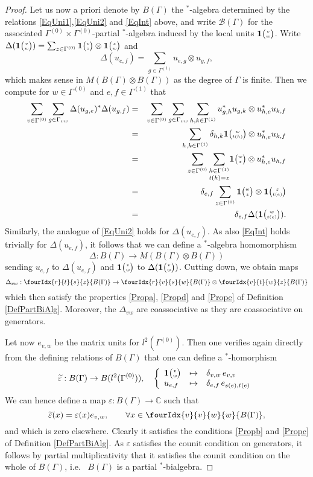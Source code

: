 \documentclass[10pt]{article}
\newcommand{\C}{\mathbb{C}}
\newcommand{\Grt}[3]{#1{\tiny {\begin{pmatrix} #2\\#3\end{pmatrix}}}}
\newcommand{\UnitC}[2]{\Grt{\mathbf{1}}{#1}{#2}}
\newcommand{\Gr}[5]{\fourIdx{#2}{#4}{#3}{#5}{#1}}%
\theoremstyle{definition}
\numberwithin{equation}{section}
\begin{document}
\begin{proof}
Let us now a priori denote by $B(\Gamma)$ the $^*$-algebra determined by the relations \eqref{EqUni1},\eqref{EqUni2} and \eqref{EqInt} above, and write $\mathscr{B}(\Gamma)$ for the associated $\Gamma^{(0)}\times \Gamma^{(0)}$-partial $^*$-algebra induced by the local units $\UnitC{v}{w}$. Write $\Delta(\UnitC{v}{w}) = \sum_{z\in \Gamma^{(0)}} \UnitC{v}{z}\otimes \UnitC{z}{w}$ and \[\Delta(u_{e,f}) = \sum_{g\in \Gamma^{(1)}} u_{e,g}\otimes u_{g,f},\] which makes sense in $M(B(\Gamma)\otimes B(\Gamma))$ as the degree of $\Gamma$ is finite. Then we compute for $w\in \Gamma^{(0)}$ and $e,f\in \Gamma^{(1)}$ that \begin{eqnarray*} \sum_{v\in \Gamma^{(0)}}\sum_{g\in \Gamma_{vw}}\Delta(u_{g,e})^*\Delta(u_{g,f}) &=& \sum_{v\in \Gamma^{(0)}}\sum_{g\in \Gamma_{vw}} \sum_{h,k\in \Gamma^{(1)}} u_{g,h}^*u_{g,k}\otimes u_{h,e}^*u_{k,f}\\ &=& \sum_{h,k\in \Gamma^{(1)}} \delta_{h,k} \UnitC{w}{t(h)}\otimes u_{h,e}^*u_{k,f}\\ &=&  \sum_{z\in \Gamma^{(0)}}\underset{t(h)=z}{\sum_{h\in \Gamma^{(1)}}} \UnitC{w}{z}\otimes u_{h,e}^*u_{h,f} \\ &=& \delta_{e,f} \sum_{z\in \Gamma^{(0)}} \UnitC{w}{z}\otimes \UnitC{z}{t(e)}\\ &=& \delta_{e,f} \Delta(\UnitC{w}{t(e)}).\end{eqnarray*}  Similarly, the analogue of \eqref{EqUni2} holds for $\Delta(u_{e,f})$. As also \eqref{EqInt} holds trivially for $\Delta(u_{e,f})$, it follows that we can define a $^*$-algebra homomorphism \[\Delta:B(\Gamma)\rightarrow M(B(\Gamma)\otimes B(\Gamma))\] sending $u_{e,f}$ to $\Delta(u_{e,f})$ and $\UnitC{v}{w}$ to $\Delta(\UnitC{v}{w})$. Cutting down, we obtain maps \[\Delta_{vw}:\Gr{B(\Gamma)}{r}{s}{t}{z}\rightarrow \Gr{B(\Gamma)}{r}{s}{v}{w}\otimes \Gr{B(\Gamma)}{v}{w}{t}{z}\] which then satisfy the properties \ref{Propa}, \ref{Propd} and \ref{Prope} of Definition \ref{DefPartBiAlg}. Moreover, the $\Delta_{vw}$ are coassociative as they are coassociative on generators.

Let now $e_{v,w}$ be the matrix units for $l^2(\Gamma^{(0)})$. Then one verifies again directly from the defining relations of $B(\Gamma)$ that one can define a $^*$-homorphism \[\widetilde{\varepsilon}: B(\Gamma)\rightarrow B(l^2(\Gamma^{(0)})),\quad \left\{\begin{array}{lll} \UnitC{v}{w}&\mapsto &\delta_{v,w}\, e_{v,v}\\ u_{e,f}&\mapsto& \delta_{e,f}\, e_{s(e),t(e)}\end{array}\right.\] We can hence define a map $\varepsilon: B(\Gamma)\rightarrow \C$ such that \[\widetilde{\varepsilon}(x) = \varepsilon(x) e_{v,w},\qquad  \forall x\in \Gr{B(\Gamma)}{v}{w}{v}{w},\] and which is zero elsewhere. Clearly it satisfies the conditions \ref{Propb} and \ref{Propc} of Definition \ref{DefPartBiAlg}. As $\varepsilon$ satisfies the counit condition on generators, it follows by partial multiplicativity that it satisfies the counit condition on the whole of $B(\Gamma)$, i.e.~ $B(\Gamma)$ is a partial $^*$-bialgebra. 


\end{proof}
\end{document}
